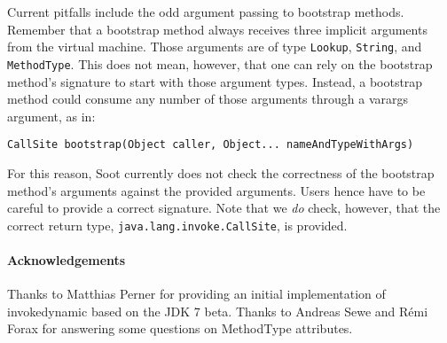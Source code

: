 \documentclass{article}
\begin{document}
Current pitfalls include the odd argument passing to bootstrap methods. Remember
that a bootstrap method always receives three implicit arguments from the
virtual machine. Those arguments are of type \texttt{Lookup}, \texttt{String},
and \texttt{MethodType}. This does not mean, however, that one can rely on the
bootstrap method's signature to start with those argument types. Instead, a
bootstrap method could consume any number of those arguments through a varargs
argument, as in:
\begin{verbatim}
CallSite bootstrap(Object caller, Object... nameAndTypeWithArgs)
\end{verbatim}
For this reason, Soot currently does not check the correctness of the bootstrap
method's arguments against the provided arguments. Users hence have to be
careful to provide a correct signature. Note that we \emph{do} check, however,
that the correct return type, \texttt{java.lang.invoke.CallSite}, is provided.

\paragraph{Acknowledgements}
Thanks to Matthias Perner for providing an initial implementation of
invokedynamic based on the JDK 7 beta. Thanks to Andreas Sewe and R\'emi Forax
for answering some questions on MethodType attributes.
\end{document}
